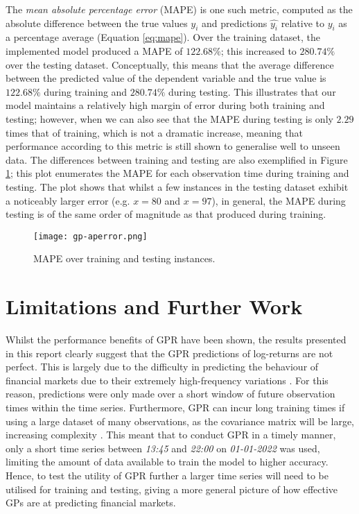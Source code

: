 \documentclass[a4paper, 11pt]{article}
\begin{document}
    The \emph{mean absolute percentage error} (MAPE) is one such metric, computed as the absolute difference between the true values $y_i$ and predictions $\hat{y_i}$ relative to $y_i$ as a percentage average (Equation \ref{eq:mape}). Over the training dataset, the implemented model produced a MAPE of $122.68\%$; this increased to $280.74\%$ over the testing dataset. Conceptually, this means that the average difference between the predicted value of the dependent variable and the true value is $122.68\%$ during training and $280.74\%$ during testing. This illustrates that our model maintains a relatively high margin of error during both training and testing; however, when we can also see that the MAPE during testing is only $2.29$ times that of training, which is not a dramatic increase, meaning that performance according to this metric is still shown to generalise well to unseen data. The differences between training and testing are also exemplified in Figure \ref{fig:mape}; this plot enumerates the MAPE for each observation time during training and testing. The plot shows that whilst a few instances in the testing dataset exhibit a noticeably larger error (e.g. $x=80$ and $x=97$), in general, the MAPE during testing is of the same order of magnitude as that produced during training.

    \begin{figure}[ht]
        \centering
        \caption{\centering MAPE over training and testing instances.}
        \texttt{[image: gp-aperror.png]}
        \label{fig:mape}
    \end{figure}

    \section{Limitations and Further Work}

    Whilst the performance benefits of GPR have been shown, the results presented in this report clearly suggest that the GPR predictions of log-returns are not perfect. This is largely due to the difficulty in predicting the behaviour of financial markets due to their extremely high-frequency variations \cite{liu-2020}. For this reason, predictions were only made over a short window of future observation times within the time series. Furthermore, GPR can incur long training times if using a large dataset of many observations, as the covariance matrix will be large, increasing complexity \cite{bitvai-2016}. This meant that to conduct GPR in a timely manner, only a short time series between \emph{13:45} and \emph{22:00} on \emph{01-01-2022} was used, limiting the amount of data available to train the model to higher accuracy. Hence, to test the utility of GPR further a larger time series will need to be utilised for training and testing, giving a more general picture of how effective GPs are at predicting financial markets.
\end{document}
